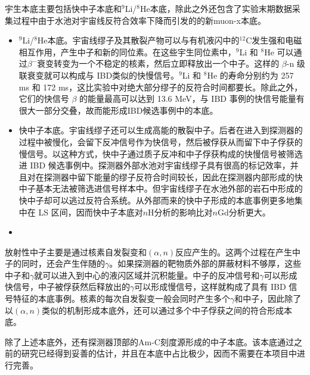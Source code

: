 \documentclass[a4paper,zihao=-4]{article}
\begin{document}
宇生本底主要包括快中子本底和$^9$Li/$^8$He本底，除此之外还包含了实验末期数据采集过程中由于水池对宇宙线反符合效率下降而引发的的新muon-x本底。
\begin{itemize}
	\item $^9$Li/$^8$He本底。宇宙线缪子及其散裂产物可以与有机液闪中的$^{12}$C发生强和电磁相互作用，产生中子和新的同位素。在这些宇生同位素中，$^9$Li 和 $^8$He 可以通过$\beta^-$衰变转变为一个不稳定的核素，然后立即释放出一个中子。这样的 $\beta$-n 级联衰变就可以构成与 IBD类似的快慢信号。$^9$Li 和 $^8$He 的寿命分别约为 257 ms 和 172 ms，这比实验中对绝大部分缪子的反符合时间都要长。除此之外，它们的快信号 $\beta$ 的能量最高可以达到 13.6 MeV，与 IBD 事例的快信号能量有很大一部分交叠，故而能形成IBD候选事例中的本底。
	\item 快中子本底。宇宙线缪子还可以生成高能的散裂中子。后者在进入到探测器的过程中被慢化，会留下反冲信号作为快信号，然后被俘获从而留下中子俘获的慢信号。以这种方式，快中子通过质子反冲和中子俘获构成的快慢信号被筛选进 IBD 候选事例中。探测器外部水池对宇宙线缪子具有很高的标记效率，并且对在探测器中留下能量的缪子反符合时间较长，因此在探测器内部形成的快中子基本无法被筛选进信号样本中。但宇宙线缪子在水池外部的岩石中形成的快中子却可以逃过反符合系统。从外部而来的快中子形成的本底事例更多地集中在 LS 区间，因而快中子本底对$n$H分析的影响比对$n$Gd分析更大。
	\item {}
\end{itemize}

放射性中子主要是通过核素自发裂变和$(\alpha,n)$反应产生的。这两个过程在产生中子的同时，还会产生伴随的$\gamma$。如果探测器的靶物质外部的屏蔽材料不够厚，这些中子和$\gamma$就可以进入到中心的液闪区域并沉积能量。中子的反冲信号和$\gamma$可以形成快信号，中子被俘获然后释放出的$\gamma$可以形成慢信号，这样就构成了具有 IBD 信号特征的本底事例。核素的每次自发裂变一般会同时产生多个$\gamma$和中子，因此除了以$(\alpha,n)$类似的机制形成本底外，还可以通过多个中子俘获之间的符合形成本底。

除了上述本底外，还有探测器顶部的Am-C刻度源形成的中子本底。该本底通过之前的研究已经得到妥善的估计，并且在本底中占比极少，因而不需要在本项目中进行完善。
\end{document}
